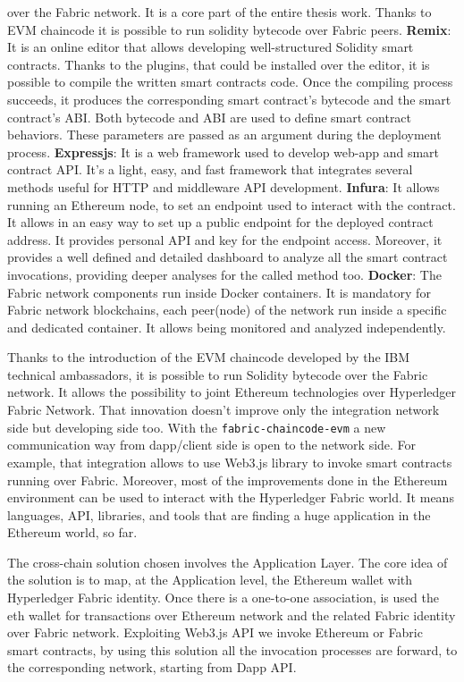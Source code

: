 \begin{outline}
    over the Fabric network. It is a core part of the entire thesis work. Thanks to EVM chaincode it is
    possible to run solidity bytecode over Fabric peers.
    \1 \textbf{Remix}: It is an online editor that allows developing well-structured Solidity smart contracts. 
    Thanks to the plugins, that could be installed over the editor, it is possible to compile the written 
    smart contracts code. Once the compiling process succeeds, it produces the corresponding smart contract's 
    bytecode and the smart contract's ABI. Both bytecode and ABI are used to define smart contract behaviors. These parameters are passed as an argument during the deployment process. 
    \1 \textbf{Expressjs}: It is a web framework used to develop web-app and smart contract API.
    It's a light, easy, and fast framework that integrates several methods useful for HTTP and middleware API development. 
    \1 \textbf{Infura}: It allows running an Ethereum node, to set an endpoint used to interact with the 
    contract. It allows in an easy way to set up a public endpoint for the deployed contract address. 
    It provides personal API and key for the endpoint access. Moreover, it provides a well defined and 
    detailed dashboard to analyze all the smart contract invocations, providing deeper analyses for the 
    called method too.  
    \1 \textbf{Docker}: The Fabric network components run inside Docker containers. It is mandatory
    for Fabric network blockchains, each peer(node) of the network run inside a specific and 
    dedicated container. It allows being monitored and analyzed independently. 
\end{outline}
\bigskip

Thanks to the introduction of the EVM chaincode developed by the IBM technical ambassadors,
it is possible to run Solidity bytecode over the Fabric network. It allows the possibility to joint 
Ethereum technologies over Hyperledger Fabric Network.
That innovation doesn't improve only the integration network side but developing side too. With the 
\texttt{fabric-chaincode-evm} a new communication way from dapp/client side is open to the network side.
For example, that integration allows to use Web3.js library to invoke smart contracts running over Fabric. 
Moreover, most of the improvements done in the Ethereum environment can be used to interact with the 
Hyperledger Fabric world. It means languages, API, libraries, and tools that are finding a huge application 
in the Ethereum world, so far. 
\bigskip

The cross-chain solution chosen involves the Application Layer. The core idea of the solution is to map, at 
the Application level, the Ethereum wallet with Hyperledger Fabric identity. Once there is a one-to-one 
association, is used the eth wallet for transactions over Ethereum network and the related Fabric 
identity over Fabric network. Exploiting Web3.js API we invoke Ethereum or Fabric smart contracts, by using 
this solution all the invocation processes are forward, to the corresponding network, starting from Dapp 
API. 
\bigskip

